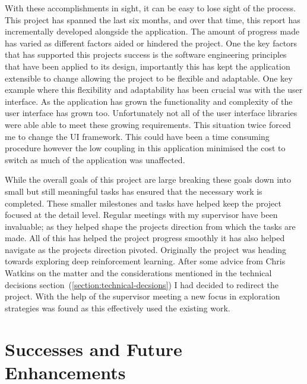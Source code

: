 \documentclass[]{final_report}
\begin{document}
With these accomplishments in sight, it can be easy to lose sight of the process. This project has spanned the last six months, and over that time, this report has incrementally developed alongside the application. The amount of progress made has varied as different factors aided or hindered the project. One the key factors that has supported this projects success is the software engineering principles that have been applied to its design, importantly this has kept the application extensible to change allowing the project to be flexible and adaptable. One key example where this flexibility and adaptability has been crucial was with the user interface. As the application has grown the functionality and complexity of the user interface has grown too. Unfortunately not all of the user interface libraries were able able to meet these growing requirements. This situation twice forced me to change the UI framework. This could have been a time consuming procedure however the low coupling in this application minimised the cost to switch as much of the application was unaffected. 

While the overall goals of this project are large breaking these goals down into small but still meaningful tasks has ensured that the necessary work is completed. These smaller milestones and tasks have helped keep the project focused at the detail level. Regular meetings with my supervisor have been invaluable; as they helped shape the projects direction from which the tasks are made. All of this has helped the project progress smoothly it has also helped navigate as the projects direction pivoted. Originally the project was heading towards exploring deep reinforcement learning. After some advice from Chris Watkins on the matter and the considerations mentioned in the technical decisions section~(\ref{section:technical-decsions}) I had decided to redirect the project. With the help of the supervisor meeting a new focus in exploration strategies was found as this effectively used the existing work. 
\newpage
\section{Successes and Future Enhancements}
\end{document}
